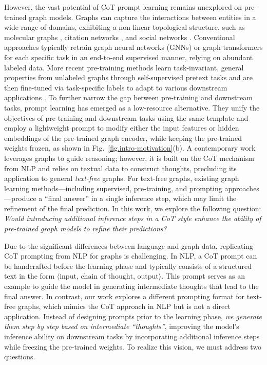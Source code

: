 However, the vast potential of CoT prompt learning remains unexplored on pre-trained graph models. Graphs can capture the interactions between entities in a wide range of domains, exhibiting a non-linear topological structure, such as molecular graphs \cite{wang2023automated,lee2023shift}, citation networks \cite{kanakia2019scalable,xiong2017explicit}, and social networks \cite{ji2023community,zhang2023capacity}.
Conventional approaches typically retrain graph neural networks (GNNs) \cite{kipf2016semi,velivckovic2017graph} or graph transformers \cite{ying2021transformers,yun2019graph} for each specific task in an end-to-end supervised manner, relying on abundant labeled data.
More recent pre-training methods \cite{velickovic2019deep,you2020graph} learn task-invariant, general properties from unlabeled graphs through self-supervised pretext tasks and are then fine-tuned via task-specific labels to adapt to various downstream applications \cite{hu2020gpt,qiu2020gcc}. To further narrow the gap between pre-training and downstream tasks, prompt learning \cite{yu2024few,liu2023graphprompt,fang2024universal} has emerged as a low-resource alternative. They unify the objectives of pre-training and downstream tasks using the same template and employ a lightweight prompt to modify either the input features or hidden embeddings of the pre-trained graph encoder, while keeping the pre-trained weights frozen, as shown in Fig.~\ref{fig.intro-motivation}(b).
A contemporary work \cite{jin2024graph} leverages graphs to guide reasoning; however, it is built on the CoT mechanism from NLP and relies on textual data to construct thoughts, precluding its application to general \emph{text-free} graphs.
For text-free graphs, existing graph learning methods---including supervised, pre-training, and prompting approaches---produce a ``final answer'' in a single inference step, which may limit the refinement of the final prediction. In this work, we explore the following question: \textit{Would introducing additional inference steps in a CoT style enhance the ability of pre-trained graph models to refine their predictions?} 

Due to the significant differences between language and graph data, replicating CoT prompting from NLP for graphs is challenging. In NLP, a CoT prompt can be handcrafted before the learning phase and typically consists of a structured text in the form \(\langle \text{input, chain of thought, output} \rangle\). This prompt serves as an example to guide the model in generating intermediate thoughts that lead to the final answer. In contrast, our work explores a different prompting format for text-free graphs, which mimics the CoT approach in NLP but is not a direct application. Instead of designing prompts prior to the learning phase, \textit{we generate them step by step based on intermediate ``thoughts''}, improving the model's inference ability on downstream tasks by incorporating additional inference steps while freezing the pre-trained weights. To realize this vision, we must address two questions.

